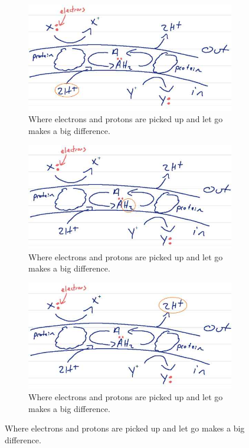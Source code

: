 \documentclass[]{article}
\begin{document}
\begin{figure}[H]
\begin{subfigure}[t]{0.45\textwidth}
	\end{subfigure}
	\begin{subfigure}[t]{0.3\textwidth}
		\caption{Where electrons and protons are picked up and let go makes a big difference.}\label{fig:RedoxLoop2}
		\includegraphics[width=\textwidth]{RedoxLoop2}
	\end{subfigure}
	\begin{subfigure}[t]{0.3\textwidth}
		\caption{Where electrons and protons are picked up and let go makes a big difference.}\label{fig:RedoxLoop3}
		\includegraphics[width=\textwidth]{RedoxLoop3}
	\end{subfigure}
	\begin{subfigure}[t]{0.3\textwidth}
		\caption{Where electrons and protons are picked up and let go makes a big difference.}\label{fig:RedoxLoop4}
		\includegraphics[width=\textwidth]{RedoxLoop4}
	\end{subfigure}
\end{figure}
\cite{alberts2013essential,simon2008organisation,weizmann2020eQuilibrator}
\end{document}

